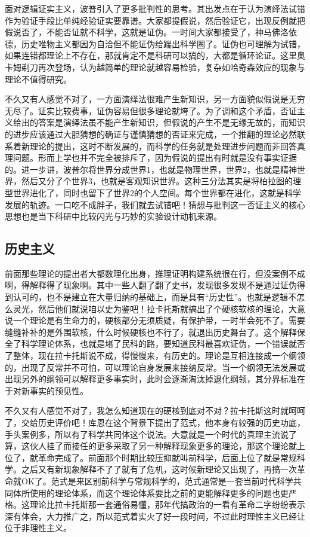 \documentclass[]{tufte-book}
\begin{document}
面对逻辑证实主义，波普引入了更多批判性的思考。其出发点在于认为演绎法试错作为验证手段比单纯经验证实要靠谱。大家都提假说，然后验证它，出现反例就把假说否了，不能否证就不科学，这就是证伪。一时间大家都接受了，神马佛洛依德，历史唯物主义都因为自洽但不能证伪给踹出科学圈了。证伪也可理解为试错，如果连错都理论上不存在，那就肯定不是科研可以搞的，大都是循环论证。这里奥卡姆剃刀再次登场，认为越简单的理论就越容易检验，复杂如哈奇森效应的现象与理论不值得研究。

不久又有人感觉不对了，一方面演绎法很难产生新知识，另一方面貌似假说是无穷无尽了。证实比较费事，证伪容易但很多理论就垮了。为了调和这个矛盾，否证主义给出的答案是演绎法虽不能产生新知识，但假说的产生不是无缘无故的，而知识的进步应该通过大胆猜想的确证与谨慎猜想的否证来完成，一个推翻的理论必然联系着新理论的提出，这时不断发展的，而科学的任务就是处理进步问题而非回答真理问题。形而上学也并不完全被排斥了，因为假说的提出有时就是没有事实证据的。进一步讲，波普尔将世界分成世界1，也就是物理世界，世界2，也就是精神世界，然后又分了个世界3，也就是客观知识世界。这种三分法其实是将柏拉图的理型世界进化了，同时也留下了世界2的个人空间。每个世界都在进化，这就是科学发展的轨迹。一口吃不成胖子，我们就去试错吧！猜想与批判这一否证主义的核心思想也是当下科研中比较闪光与巧妙的实验设计动机来源。

\hypertarget{ux5386ux53f2ux4e3bux4e49}{%
\subsection{历史主义}\label{ux5386ux53f2ux4e3bux4e49}}

前面那些理论的提出者大都数理化出身，推理证明构建系统很在行，但没案例不成啊，得解释得了现象啊。其中一些人翻了翻了史书，发现很多发现不是通过证伪得到认可的，也不是建立在大量归纳的基础上，而是具有``历史性''。也就是逻辑不怎么灵光，然后他们就说咱以史为鉴吧！拉卡托斯就搞出了个硬核软核的理论，大意说一个理论是有生命力的，硬核部分无须质疑，有保护带，一时半会死不了。需要缝缝补补的是外围软核，什么时候硬核也不行了，就退出历史舞台了。这个解释保全了科学理论体系，也就是堵了民科的路，要知道民科最喜欢证伪，一个错误就否了整体，现在拉卡托斯说不成，得慢慢来，有历史的。理论是互相连接成一个纲领的，出现了反常并不可怕，可以理论自身发展来接纳反常。当一个纲领无法发展或出现另外的纲领可以解释更多事实时，此时会逐渐淘汰掉退化纲领，其分界标准在于对新事实的预见性。

不久又有人感觉不对了，我怎么知道现在的硬核到底对不对？拉卡托斯这时就呵呵了，交给历史评价吧！库恩在这个背景下提出了范式，他本身有较强的历史功底，手头案例多，所以有了科学共同体这个说法。大意就是一个时代的真理主流说了算，这伙人挂了而接任的更多采取了另一种解释现象更多的理论，那这个理论就上位了，就革命完成了。前面那个时期比较压抑就叫前科学，后面上位了就是常规科学。之后又有新现象解释不了了就有了危机，这时候新理论又出现了，再搞一次革命就OK了。范式是来区别前科学与常规科学的，范式通常是一套当前时代科学共同体所使用的理论体系，而这个理论体系要比之前的更能解释更多的问题也更严格。这理论比拉卡托斯那一套通俗易懂，那年代搞政治的一看有革命二字纷纷表示深有体会，大力推广之，所以范式着实火了好一段时间，不过此时理性主义已经让位于非理性主义。
\end{document}
